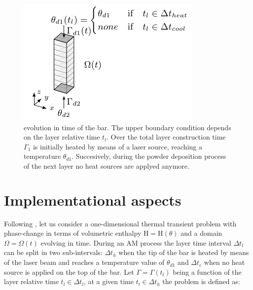 \documentclass[3p]{article}
\begin{document}
\begin{figure}[h!]
\centering
\includegraphics[width=0.8\linewidth]{externals/Pictures/PODXIGAProblemDomain.pdf}
\caption{evolution in time of the bar. The upper boundary condition depends on the layer relative time $t_{l}$. Over the total layer construction time $\Gamma_{1}$ is initially heated by means of a laser source, reaching a temperature $\theta_{d1}$. Succesively, during the powder deposition process of the next layer no heat sources are applyed anymore.}
\label{PODXIGADomain}
\end{figure}


\section*{Implementational aspects}

Following \cite{Celentano1994}, let us consider a one-dimensional thermal transient problem with phase-change in terms of volumetric enthalpy $\mathrm{H}=\mathrm{H}(\theta)$ and a domain $\Omega = \Omega(t)$ evolving in time. During an AM process 
the layer time interval $\Delta t_{l}$ can be split in two sub-intervals: $\Delta t_{h}$ when the tip of the bar is heated by means of the laser beam and reaches a temperature value of $\theta_{d1}$ and $\Delta t_{c}$ when no heat source is applied on the top of the bar. Let $\Gamma = \Gamma(t_{l})$ being a function of the layer relative time $t_{l} \in \Delta t_{l}$, at a given time $t_{l}\in \Delta t_{h}$ the problem is defined as:
\end{document}
